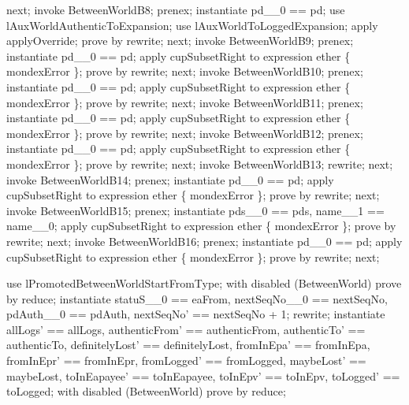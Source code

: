 \begin{LPScript}
\begin{zproof}[lPromotedBetweenWorldStartFromType]
    next;
        invoke BetweenWorldB8;
        prenex;
        instantiate pd\_\_0 == pd;
        use lAuxWorldAuthenticToExpansion;
        use lAuxWorldToLoggedExpansion;
        apply applyOverride;
        prove by rewrite;
    next;
        invoke BetweenWorldB9;
        prenex;
        instantiate pd\_\_0 == pd;
        apply cupSubsetRight to expression ether \cup \{ mondexError \};
        prove by rewrite;
    next;
        invoke BetweenWorldB10;
        prenex;
        instantiate pd\_\_0 == pd;
        apply cupSubsetRight to expression ether \cup \{ mondexError \};
        prove by rewrite;
    next;
        invoke BetweenWorldB11;
        prenex;
        instantiate pd\_\_0 == pd;
        apply cupSubsetRight to expression ether \cup \{ mondexError \};
        prove by rewrite;
    next;
        invoke BetweenWorldB12;
        prenex;
        instantiate pd\_\_0 == pd;
        apply cupSubsetRight to expression ether \cup \{ mondexError \};
        prove by rewrite;
    next;
        invoke BetweenWorldB13;
        rewrite;
    next;
        invoke BetweenWorldB14;
        prenex;
        instantiate pd\_\_0 == pd;
        apply cupSubsetRight to expression ether \cup \{ mondexError \};
        prove by rewrite;
    next;
        invoke BetweenWorldB15;
        prenex;
        instantiate pds\_\_0 == pds, name\_\_1 == name\_\_0;
        apply cupSubsetRight to expression ether \cup \{ mondexError \};
        prove by rewrite;
    next;
        invoke BetweenWorldB16;
        prenex;
        instantiate pd\_\_0 == pd;
        apply cupSubsetRight to expression ether \cup \{ mondexError \};
        prove by rewrite;
    next;
\end{zproof}\end{LPScript}

\begin{LPScript}\begin{zproof}[tBetwStartFromEafromOkayPRE]
    use lPromotedBetweenWorldStartFromType;
    with disabled (BetweenWorld) prove by reduce;
    instantiate statuS\_\_0 == eaFrom, nextSeqNo\_\_0 == nextSeqNo,
        pdAuth\_\_0 == pdAuth, nextSeqNo' == nextSeqNo + 1;
    rewrite;
    instantiate allLogs' == allLogs, authenticFrom' == authenticFrom,
        authenticTo' == authenticTo, definitelyLost' == definitelyLost,
        fromInEpa' == fromInEpa, fromInEpr' == fromInEpr,
        fromLogged' == fromLogged, maybeLost' == maybeLost,
        toInEapayee' == toInEapayee, toInEpv' == toInEpv,
        toLogged' == toLogged;
    with disabled (BetweenWorld) prove by reduce;
\end{zproof}\end{LPScript}

